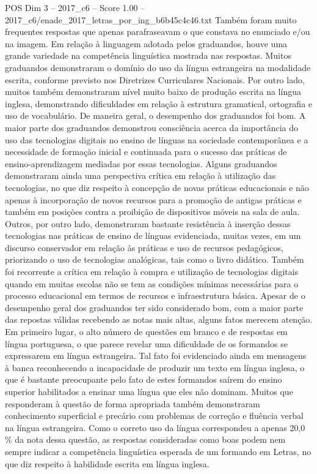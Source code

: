 \begin{textsample}{POS Dim 3 – 2017\_c6 – Score 1.00 – 2017\_c6/enade\_2017\_letras\_por\_ing\_b6b45c4c46.txt}
Também foram muito frequentes respostas que apenas parafraseavam o que constava no enunciado e/ou na imagem.
Em relação à linguagem adotada pelos graduandos, houve uma grande variedade na competência linguística mostrada nas respostas.
Muitos graduandos demonstraram o domínio do uso da língua estrangeira na modalidade escrita, conforme previsto nos Diretrizes Curriculares Nacionais.
Por outro lado, muitos também demonstraram nível muito baixo de produção escrita na língua inglesa, demonstrando dificuldades em relação à estrutura gramatical, ortografia e uso de vocabulário.
De maneira geral, o desempenho dos graduandos foi bom.
A maior parte dos graduandos demonstrou consciência acerca da importância do uso das tecnologias digitais no ensino de línguas na sociedade contemporânea e a necessidade de formação inicial e continuada para o sucesso das práticas de ensino-aprendizagem mediadas por essas tecnologias.
Alguns graduandos demonstraram ainda uma perspectiva crítica em relação à utilização das tecnologias, no que diz respeito à concepção de novas práticas educacionais e não apenas à incorporação de novos recursos para a promoção de antigas práticas e também em posições contra a proibição de dispositivos móveis na sala de aula.
Outros, por outro lado, demonstraram bastante resistência à inserção dessas tecnologias nas práticas de ensino de línguas evidenciada, muitas vezes, em um discurso conservador em relação às práticas e uso de recursos pedagógicos, priorizando o uso de tecnologias analógicas, tais como o livro didático.
Também foi recorrente a crítica em relação à compra e utilização de tecnologias digitais quando em muitas escolas não se tem as condições mínimas necessárias para o processo educacional em termos de recursos e infraestrutura básica.
Apesar de o desempenho geral dos graduandos ter sido considerado bom, com a maior parte das repostas válidas recebendo as notas mais altas, alguns fatos merecem atenção.
Em primeiro lugar, o alto número de questões em branco e de respostas em língua portuguesa, o que parece revelar uma dificuldade de os formandos se expressarem em língua estrangeira.
Tal fato foi evidenciado ainda em mensagens à banca reconhecendo a incapacidade de produzir um texto em língua inglesa, o que é bastante preocupante pelo fato de estes formandos saírem do ensino superior habilitados a ensinar uma língua que eles não dominam.
Muitos que responderam à questão de forma apropriada também demonstraram conhecimento superficial e precário com problemas de correção e fluência verbal na língua estrangeira.
Como o correto uso da língua correspondeu a apenas 20,0 \% da nota dessa questão, as respostas consideradas como boas podem nem sempre indicar a competência linguística esperada de um formando em Letras, no que diz respeito à habilidade escrita em língua inglesa.

\end{textsample}
